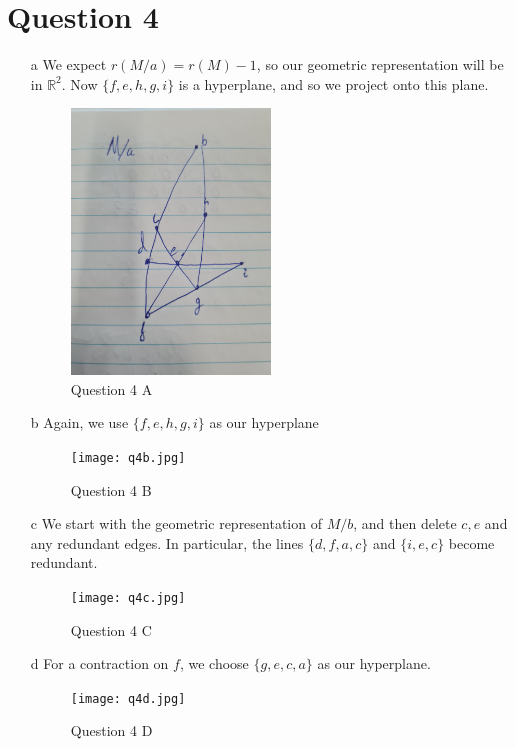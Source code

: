 \documentclass{article}
\begin{document}
\section*{Question 4}
\begin{enumerate}
    \item[a] We expect $r(M/a)=r(M)-1$, so our geometric representation will be in $\mathbb{R}^2$. Now $\{f, e, h, g, i\}$ is a hyperplane,
        and so we project onto this plane.
        \begin{figure}[!htb]
            \centering
            \includegraphics[width=0.5\textwidth, angle=-90]{q4a.jpg}
            \caption{Question 4 A}
        \end{figure}
    \item[b] Again, we use $\{f, e, h, g, i\}$ as our hyperplane
        \begin{figure}[!htb]
            \centering
            \texttt{[image: q4b.jpg]}
            \caption{Question 4 B}
        \end{figure}
    \item[c] We start with the geometric representation of $M/b$, and then delete $c, e$ and any redundant edges.
        In particular, the lines $\{d, f, a, c\}$ and $\{i, e, c\}$ become redundant.
        \begin{figure}
            \centering
            \texttt{[image: q4c.jpg]}
            \caption{Question 4 C}
        \end{figure}
    \item[d] For a contraction on $f$, we choose $\{g, e, c, a\}$ as our hyperplane.
        \begin{figure}
            \centering
            \texttt{[image: q4d.jpg]}
            \caption{Question 4 D}
        \end{figure}


\end{enumerate}
\end{document}
